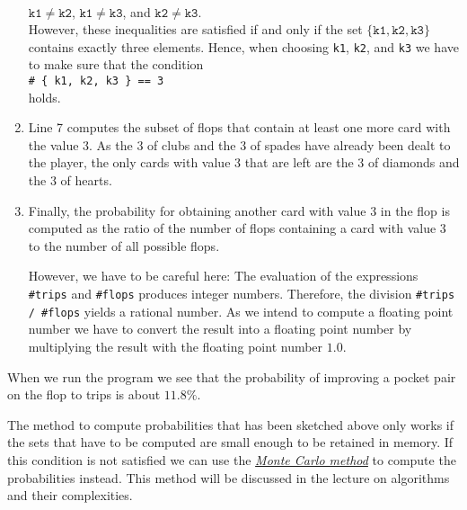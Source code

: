 \begin{enumerate}
      \\[0.2cm]
      \hspace*{1.3cm}
      $\mathtt{k1} \not= \mathtt{k2}$, \quad $\mathtt{k1} \not= \mathtt{k3}$,  \quad and \quad $\mathtt{k2} \not= \mathtt{k3}$.
      \\[0.2cm]
      However, these inequalities are satisfied if and only if the set 
      $\{ \mathtt{k1}, \mathtt{k2}, \mathtt{k3} \}$ contains exactly three elements.  Hence, when
      choosing \texttt{k1}, \texttt{k2}, and \texttt{k3} we have to make sure that the condition
      \\[0.2cm]
      \hspace*{1.3cm}
      \texttt{\# \{ k1, k2, k3 \} == 3 }
      \\[0.2cm]
      holds.
\item Line 7 computes the subset of flops that contain at least one more card with the value 3.
      As the 3 of clubs and the 3 of spades have already been dealt to the player, the only cards
      with value 3 that are left are the 3 of diamonds and the 3 of hearts.
\item Finally, the probability for obtaining another card with value 3 in the flop is computed as
      the ratio of the number of flops containing a card with value 3 to the number of all possible flops.

      However, we have to be careful here:  The evaluation of the expressions
      \texttt{\#trips} and \texttt{\#flops} produces integer numbers.  Therefore, the division
      \texttt{\#trips / \#flops} yields a rational number.  As we intend to compute a floating point
      number we have to convert the result into a floating point number by multiplying the result
      with the floating point number $1.0$.
\end{enumerate}
When we run the program we see that the probability of improving a pocket pair on the flop to trips
is about  $11.8\%$.

\remarkEng
The method to compute probabilities that has been sketched above only works if the sets that have to
be computed are small enough to be retained in memory.  If this condition is
not satisfied we can use the \href{https://en.wikipedia.org/wiki/Monte_Carlo_method}{\emph{Monte Carlo method}} 
to compute the probabilities instead.  This method will be discussed in the lecture on algorithms
and their complexities. 


